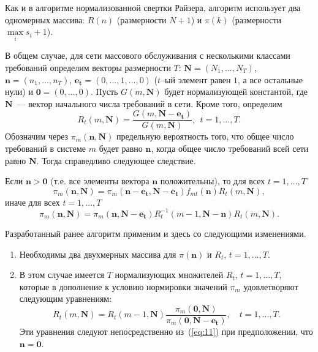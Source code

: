 Как и в алгоритме нормализованной свертки Райзера, алгоритм использует два одномерных массива: $R(n)$ (размерности $N+1$) и $\pi(k)$ (размерности $\max\limits_{i} s_i+1$).

В общем случае, для сети массового обслуживания с несколькими классами требований определим векторы размерности $T$: $\mathbf{N}=(N_1,...,N_T)$, $\mathbf{n}=(n_1,...,n_T)$, $\mathbf{e_t}=(0,...,1,...,0)$ ($t$--ый элемент равен $1$, а все остальные нули) и $\mathbf{0}=(0,...,0)$. Пусть $G(m,\mathbf{N})$ будет нормализующей константой, где $\mathbf{N}$~--- вектор начального числа требований в сети. Кроме того, определим
\begin{equation*}
R_t(m,\mathbf{N}) = \frac{G(m,\mathbf{N}-\mathbf{e_t})}{G(m,\mathbf{N})},~~t=1,...,T.
\end{equation*}
Обозначим через $\pi_m(\mathbf{n},\mathbf{N})$ предельную вероятность того, что общее число требований в системе $m$ будет равно $\mathbf{n}$, когда общее число требований всей сети равно $\mathbf{N}$. Тогда справедливо следующее следствие.

\begin{corollary}
 Если $\mathbf{n} > \mathbf{0}$ (т.е. все элементы вектора $\mathbf{n}$ положительны), то для всех $t=1,...,T$
 \begin{equation}
  \pi_m(\mathbf{n},\mathbf{N}) = \pi_m(\mathbf{n}-\mathbf{e_t},\mathbf{N}-\mathbf{e_t})
  f_{mt}(\mathbf{n}) R_t(m,\mathbf{N}) ,
  \label{eq:10}
 \end{equation}
 иначе для всех $t=1,...,T$
  \begin{equation}
  \pi_m(\mathbf{n},\mathbf{N}) = \pi_m(\mathbf{n},\mathbf{N}-\mathbf{e_t}) R_t^{-1}(m-1,\mathbf{N}-\mathbf{n}) R_t(m,\mathbf{N}) .
  \label{eq:11}
 \end{equation}
\end{corollary}

Разработанный ранее алгоритм применим и здесь со следующими изменениями.
\begin{enumerate}
\item Необходимы два двухмерных массива для $\pi(\mathbf{n})$ и $R_t$, $t=1,...,T$.
\item В этом случае имеется $T$ нормализующих множителей $R_t$, $t=1,...,T$, которые в дополнение к условию нормировки значений $\pi_m$ удовлетворяют следующим уравнениям:
\begin{equation}
 R_t(m,\mathbf{N}) = R_t(m-1,\mathbf{N}) \frac{\pi_m(\mathbf{0},\mathbf{N})}
 {\pi_m(\mathbf{0},\mathbf{N}-\mathbf{e_t})}, \quad t=1,...,T .
 \label{eq:12}
\end{equation}
Эти уравнения следуют непосредственно из~(\ref{eq:11}) при предположении, что $\mathbf{n}=\mathbf{0}$.
\end{enumerate}

